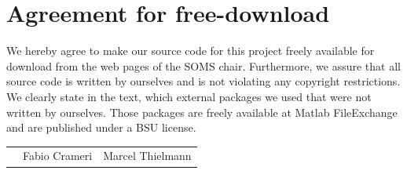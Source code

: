 \documentclass[11pt]{article}
\begin{document}

\newpage


\newpage
\section*{Agreement for free-download}
\bigskip


\bigskip


\large We hereby agree to make our source code for this project freely available for download from the web pages of the SOMS chair. Furthermore, we assure that all source code is written by ourselves and is not violating any copyright restrictions. We clearly state in the text, which external packages we used that were not written by ourselves. Those packages are freely available at Matlab FileExchange and are published under a BSU license. 
\begin{center}

\bigskip


\bigskip


\begin{tabular}{@{}p{3.3cm}@{}p{6cm}@{}@{}p{6cm}@{}}
\begin{minipage}{3cm}

\end{minipage}
&
\begin{minipage}{6cm}
\vspace{2mm} \large Fabio Crameri


\end{minipage}
&
\begin{minipage}{6cm}

\vspace{2mm} \large Marcel Thielmann

\end{minipage}
\end{tabular}


\end{center}
\newpage






\end{document}
